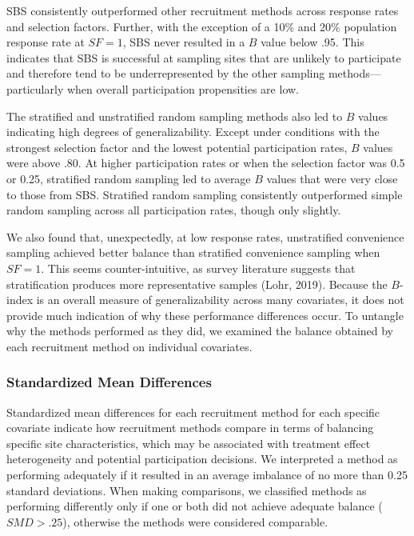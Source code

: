 \documentclass[
  man,floatsintext]{apa6}
\begin{document}
SBS consistently outperformed other recruitment methods across response rates and selection factors. Further, with the exception of a 10\% and 20\% population response rate at \(SF = 1\), SBS never resulted in a \(B\) value below .95. This indicates that SBS is successful at sampling sites that are unlikely to participate and therefore tend to be underrepresented by the other sampling methods---particularly when overall participation propensities are low.

The stratified and unstratified random sampling methods also led to \(B\) values indicating high degrees of generalizability. Except under conditions with the strongest selection factor and the lowest potential participation rates, \(B\) values were above .80. At higher participation rates or when the selection factor was 0.5 or 0.25, stratified random sampling led to average \(B\) values that were very close to those from SBS. Stratified random sampling consistently outperformed simple random sampling across all participation rates, though only slightly.

We also found that, unexpectedly, at low response rates, unstratified convenience sampling achieved better balance than stratified convenience sampling when \(SF = 1\). This seems counter-intuitive, as survey literature suggests that stratification produces more representative samples (Lohr, 2019). Because the \(B\)-index is an overall measure of generalizability across many covariates, it does not provide much indication of why these performance differences occur. To untangle why the methods performed as they did, we examined the balance obtained by each recruitment method on individual covariates.

\hypertarget{standardized-mean-differences}{%
\subsubsection*{Standardized Mean Differences}\label{standardized-mean-differences}}

Standardized mean differences for each recruitment method for each specific covariate indicate how recruitment methods compare in terms of balancing specific site characteristics, which may be associated with treatment effect heterogeneity and potential participation decisions.
We interpreted a method as performing adequately if it resulted in an average imbalance of no more than 0.25 standard deviations. When making comparisons, we classified methods as performing differently only if one or both did not achieve adequate balance (\(SMD > .25\)), otherwise the methods were considered comparable.
\end{document}
